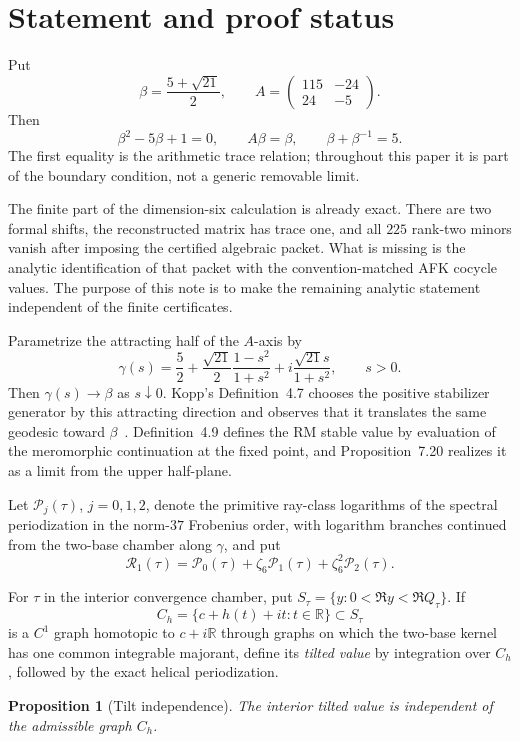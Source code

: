 \documentclass[11pt]{article}
\newtheorem{proposition}[theorem]{Proposition}
\begin{document}
\section{Statement and proof status}

Put
\[
 \beta=\frac{5+\sqrt{21}}2,\qquad
 A=\begin{pmatrix}115&-24\\24&-5\end{pmatrix}.
\tag{1}
\]
Then
\[
 \beta^2-5\beta+1=0,\qquad A\beta=\beta,\qquad
 \beta+\beta^{-1}=5.
\tag{2}
\]
The first equality is the arithmetic trace relation; throughout this
paper it is part of the boundary condition, not a generic removable
limit.

The finite part of the dimension-six calculation is already exact.
There are two formal shifts, the reconstructed matrix has trace one,
and all $225$ rank-two minors vanish after imposing the certified
algebraic packet.  What is missing is the analytic identification of
that packet with the convention-matched AFK cocycle values.  The
purpose of this note is to make the remaining analytic statement
independent of the finite certificates.

Parametrize the attracting half of the $A$-axis by
\[
 \gamma(s)=\frac52+
 \frac{\sqrt{21}}2\frac{1-s^2}{1+s^2}
 +i\frac{\sqrt{21}s}{1+s^2},\qquad s>0.
\]
Then $\gamma(s)\to\beta$ as $s\downarrow0$.
Kopp's Definition~4.7 chooses the positive stabilizer generator by this
attracting direction and observes that it translates the same geodesic
toward $\beta$~\cite{Kopp}.  Definition~4.9 defines the RM stable value
by evaluation of the meromorphic continuation at the fixed point, and
Proposition~7.20 realizes it as a limit from the upper half-plane.

Let $\mathcal P_j(\tau)$, $j=0,1,2$, denote the primitive ray-class
logarithms of the spectral periodization in the norm-$37$ Frobenius
order, with logarithm branches continued from the two-base chamber
along $\gamma$, and put
\[
 \mathcal R_1(\tau)=
 \mathcal P_0(\tau)+\zeta_6\mathcal P_1(\tau)
 +\zeta_6^2\mathcal P_2(\tau).
\]

For $\tau$ in the interior convergence chamber, put
$S_\tau=\{y:0<\Re y<\Re Q_\tau\}$.  If
\[
 C_h=\{c+h(t)+it:t\in\mathbb R\}\subset S_\tau
\]
is a $C^1$ graph homotopic to $c+i\mathbb R$ through graphs on which
the two-base kernel has one common integrable majorant, define its
\emph{tilted value} by integration over $C_h$, followed by the exact
helical periodization.

\begin{proposition}[Tilt independence]\label{prop:tilt}
The interior tilted value is independent of the admissible graph
$C_h$.
\end{proposition}
\end{document}
